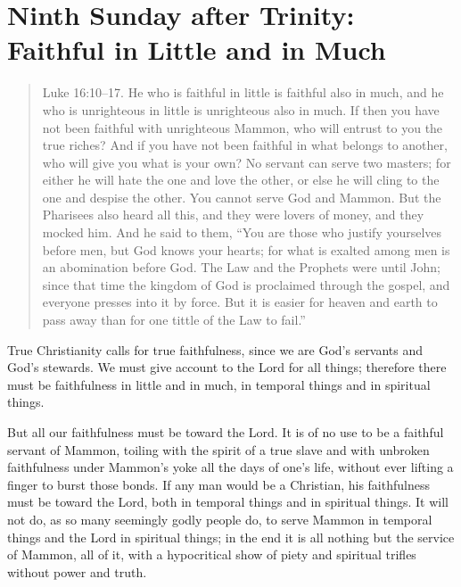 

\section{Ninth Sunday after Trinity: Faithful in Little and in Much}



\begin{quote}

Luke 16:10–17. He who is faithful in little is faithful also in much, and he who is unrighteous in little is unrighteous also in much. If then you have not been faithful with unrighteous Mammon, who will entrust to you the true riches? And if you have not been faithful in what belongs to another, who will give you what is your own? No servant can serve two masters; for either he will hate the one and love the other, or else he will cling to the one and despise the other. You cannot serve God and Mammon.
But the Pharisees also heard all this, and they were lovers of money, and they mocked him. And he said to them, “You are those who justify yourselves before men, but God knows your hearts; for what is exalted among men is an abomination before God. The Law and the Prophets were until John; since that time the kingdom of God is proclaimed through the gospel, and everyone presses into it by force. But it is easier for heaven and earth to pass away than for one tittle of the Law to fail.”

\end{quote}

\bigskip


True Christianity calls for true faithfulness, since we are God’s servants and God’s stewards. We must give account to the Lord for all things; therefore there must be faithfulness in little and in much, in temporal things and in spiritual things.

But all our faithfulness must be toward the Lord. It is of no use to be a faithful servant of Mammon, toiling with the spirit of a true slave and with unbroken faithfulness under Mammon’s yoke all the days of one’s life, without ever lifting a finger to burst those bonds. If any man would be a Christian, his faithfulness must be toward the Lord, both in temporal things and in spiritual things. It will not do, as so many seemingly godly people do, to serve Mammon in temporal things and the Lord in spiritual things; in the end it is all nothing but the service of Mammon, all of it, with a hypocritical show of piety and spiritual trifles without power and truth.


